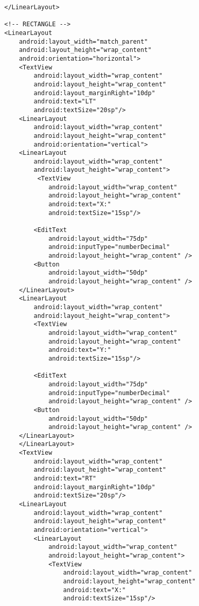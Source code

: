 \begin{lstlisting}
        </LinearLayout>

        <!-- RECTANGLE -->
        <LinearLayout
            android:layout_width="match_parent"
            android:layout_height="wrap_content"
            android:orientation="horizontal">
            <TextView
                android:layout_width="wrap_content"
                android:layout_height="wrap_content"
                android:layout_marginRight="10dp"
                android:text="LT"
                android:textSize="20sp"/>
            <LinearLayout
                android:layout_width="wrap_content"
                android:layout_height="wrap_content"
                android:orientation="vertical">
            <LinearLayout
                android:layout_width="wrap_content"
                android:layout_height="wrap_content">
                 <TextView
                    android:layout_width="wrap_content"
                    android:layout_height="wrap_content"
                    android:text="X:"
                    android:textSize="15sp"/>

                <EditText
                    android:layout_width="75dp"
                    android:inputType="numberDecimal"
                    android:layout_height="wrap_content" />
                <Button
                    android:layout_width="50dp"
                    android:layout_height="wrap_content" />
            </LinearLayout>
            <LinearLayout
                android:layout_width="wrap_content"
                android:layout_height="wrap_content">
                <TextView
                    android:layout_width="wrap_content"
                    android:layout_height="wrap_content"
                    android:text="Y:"
                    android:textSize="15sp"/>

                <EditText
                    android:layout_width="75dp"
                    android:inputType="numberDecimal"
                    android:layout_height="wrap_content" />
                <Button
                    android:layout_width="50dp"
                    android:layout_height="wrap_content" />
            </LinearLayout>
            </LinearLayout>
            <TextView
                android:layout_width="wrap_content"
                android:layout_height="wrap_content"
                android:text="RT"
                android:layout_marginRight="10dp"
                android:textSize="20sp"/>
            <LinearLayout
                android:layout_width="wrap_content"
                android:layout_height="wrap_content"
                android:orientation="vertical">
                <LinearLayout
                    android:layout_width="wrap_content"
                    android:layout_height="wrap_content">
                    <TextView
                        android:layout_width="wrap_content"
                        android:layout_height="wrap_content"
                        android:text="X:"
                        android:textSize="15sp"/>


\end{lstlisting}
